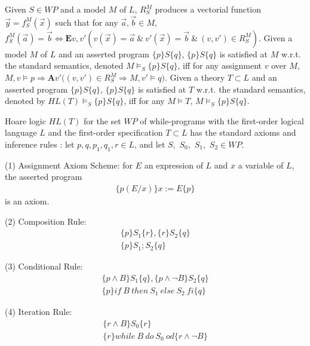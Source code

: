 \documentclass[a4paper,11pt]{article}
\begin{document}
Given $S\in WP$ and a model $M$ of $L$, $R_S^M$ produces a vectorial function $\vec{y} = f_S^{M}(\vec{x})$ such that for any $\vec{a},\vec{b}\in M$, $f_S^M(\vec{a}) = \vec{b} \Leftrightarrow \textbf{E} v,v' ( v(\vec{x})=\vec{a}\ \&\ v'(\vec{x})=\vec{b}\ \&\ (v,v')\in R_S^M )$. Given a model $M$ of $L$ and an asserted program $\{p\}S\{q\}$, $\{p\}S\{q\}$ is satisfied at $M$ w.r.t. the standard semantics, denoted $M\models_S \{p\}S\{q\}$, iff for any assignment $v$ over $M$, $M,v\models p \Rightarrow \textbf{A}v'\big((v,v')\in R_S^M \Rightarrow M,v'\models q\big)$. Given a theory $T\subset L$ and an asserted program $\{p\}S\{q\}$, $\{p\}S\{q\}$ is satisfied at $T$ w.r.t. the standard semantics, denoted by $HL(T)\models_S \{p\}S\{q\}$, iff for any $M\models T$, $M \models_S \{p\}S\{q\}$.

Hoare logic $HL(T)$ for the set $WP$ of while-programs with the first-order logical language $L$ and the first-order specification $T\subset L$ has the standard axioms and inference rules \cite[Section 2]{apt_1}: let $p, q, p_1, q_1, r \in L$, and let $S,$ $S_0,$ $S_1,$ $S_2 \in WP$.

(1) Assignment Axiom Scheme: for $E$ an expression of $L$ and $x$ a variable of $L$, the asserted program
\begin{displaymath}
\begin{array}{l}
\{p(E/x)\}x:=E\{p\}
\end{array}
\end{displaymath}
is an axiom.

(2) Composition Rule:
\begin{displaymath}
\begin{array}{c}
  \{p\}S_1\{r\},\{r\}S_2\{q\} \\
  \hline
  \{p\}S_1;S_2\{q\}
\end{array}
\end{displaymath}

(3) Conditional Rule:
\begin{displaymath}
\begin{array}{c}
  \{p\wedge B\}S_1\{q\},\{p\wedge \neg B\}S_2\{q\} \\
  \hline
  \{p\}if\ B\ then\ S_1\ else\ S_2\ fi\{q\}
\end{array}
\end{displaymath}

(4) Iteration Rule:
\begin{displaymath}
\begin{array}{c}
  \{r\wedge B\}S_0\{r\} \\
  \hline
  \{r\}while\ B\ do\ S_0\ od\{r\wedge \neg B\}
\end{array}
\end{displaymath}
\end{document}
